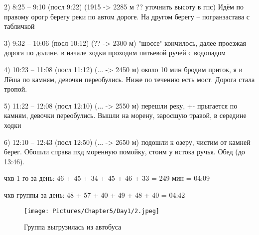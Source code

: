 2) 8:25 -- 9:10 (посл 9:22)  (1915 -> 2285 м ?? уточнить высоту в гпс) Идём по правому орогр берегу реки по автом дороге. На другом берегу -- погранзастава с табличкой

3) 9:32 -- 10:06 (посл 10:12) (?? -> 2300 м) "шоссе" кончилось, далее проезжая дорога по долине. в начале ходки проходим питьевой ручей с водопадом

4) 10:23 -- 11:08 (посл 11:12) (... -> 2450 м) около 10 мин бродим приток, я и Лёша по камням, девочки переобулись. Ниже по течению есть мост. Дорога стала тропой.

5) 11:22 -- 12:08 (посл 12:10) (... -> 2550 м) перешли реку, +- прыгается по камням, девочки переобулись. Вышли на морену, заросшую травой, в середине ходки

6) 12:10 -- 12:43 (посл 12:50) (... -> 2650 м) подошли к озеру, чистим от камней берег. Обошли справа пхд моренную помойку, стоим у истока ручья. Обед (до 13:46).

чхв 1-го за день: 46 + 45 + 34 + 45 + 46 + 33 = 249 мин = 04:09

чхв группы за день: 48 + 57 + 40 + 49 + 48 + 40 = 04:42

    \begin{figure}[hb]
        \centering
        \texttt{[image: Pictures/Chapter5/Day1/2.jpeg]}
        \caption{Группа выгрузилась из автобуса}
        \label{fig:Day1_2}
    \end{figure}

    \FloatBarrier